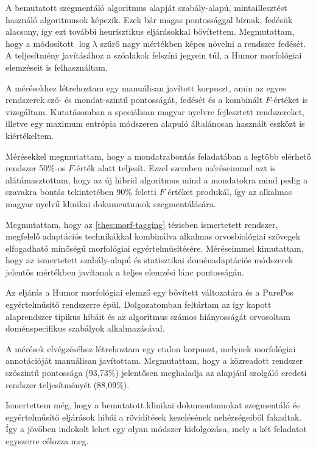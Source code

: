 A bemutatott szegmentáló algoritmus alapját szabály-alapú, mintaillesztést használó algoritmusok képezik. 
Ezek bár magas pontossággal bírnak, fedésük alacsony, így ezt további heurisztikus eljárásokkal bővítettem.
Megmutattam, hogy a módosított $\log \lambda$ szűrő nagy mértékben képes növelni a rendszer fedését. 
A teljesítmény javításához a szóalakok felszíni jegyein túl, a Humor morfológiai elemzéseit is felhasználtam.

A mérésekhez létrehoztam egy manuálisan javított korpuszt, amin az egyes rendszerek szó- és mondat-szintű pontosságát, fedését és a kombinált $F$-értéket is vizsgáltam.  
Kutatásomban a speciálisan magyar nyelvre fejlesztett rendszereket, illetve egy maximum entrópia módszeren alapuló általánosan használt eszközt is kiértékeltem.

Mérésekkel megmutattam, hogy a mondatrabontás feladatában a legtöbb elérhető rendszer 50\%-os $F$-érték alatt teljesít. 
Ezzel szemben méréseimmel azt is alátámasztottam, hogy az új hibrid algoritmus mind a mondatokra mind pedig a szavakra bontás tekintetében 90\% feletti $F$ értéket produkál, így az alkalmas 
magyar nyelvű klinikai dokumentumok szegmentálására.

\thesisline%

\begin{core}
\begin{thesis}%
\label{thes:clin-pos}
Megmutattam, hogy az \ref{thes:morf-tagging} tézisben ismertetett rendszer, megfelelő adaptációs technikákkal kombinálva alkalmas orvosbiológiai szövegek elfogadható minőségű morfológiai egyértelműsítésére. 
Méréseimmel kimutattam, hogy az ismertetett szabály-alapú és statisztikai doménadaptációs módszerek jelentős mértékben javítanak a teljes elemzési lánc pontosságán.
\end{thesis}

\begin{pub}
\cite{Orosz2013,Orosz2014b} 
\end{pub}
\end{core}

Az eljárás a Humor morfológiai elemző egy bővített változatára és a PurePos egyértelműsítő rendszerre épül. 
Dolgozatomban feltártam az így kapott alaprendszer tipikus hibáit és az algoritmus számos hiányosságát orvosoltam doménspecifikus szabályok alkalmazásával. 

A mérések elvégzéséhez létrehoztam egy etalon korpuszt, melynek morfológiai annotációját manuálisan javítottam. 
Megmutattam, hogy a közreadott rendszer szószintű pontossága (93,73\%) jelentősen meghaladja az alapjául szolgáló eredeti rendszer teljesítményét (88,09\%). 

Ismertettem még, hogy a bemutatott klinikai dokumentumokat szegmentáló és egyértelműsítő eljárások hibái a rövidítések kezelésének nehézségeiből fakadtak.
Így a jövőben indokolt lehet egy olyan módszer kidolgozása, mely a két feladatot egyszerre célozza meg.

\let\thesubsection=\oldthesubsection
